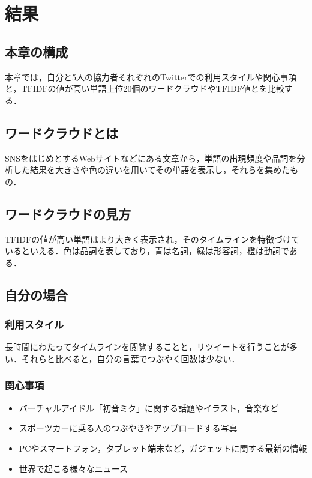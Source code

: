 \chapter{結果}

\section{本章の構成}
本章では，自分と5人の協力者それぞれのTwitterでの利用スタイルや関心事項と，TFIDFの値が高い単語上位20個のワードクラウドやTFIDF値とを比較する．

\section{ワードクラウドとは}
SNSをはじめとするWebサイトなどにある文章から，単語の出現頻度や品詞を分析した結果を大きさや色の違いを用いてその単語を表示し，それらを集めたもの．

\section{ワードクラウドの見方}
TFIDFの値が高い単語はより大きく表示され，そのタイムラインを特徴づけているといえる．色は品詞を表しており，青は名詞，緑は形容詞，橙は動詞である．

\section{自分の場合}

\subsection{利用スタイル}
長時間にわたってタイムラインを閲覧することと，リツイートを行うことが多い．それらと比べると，自分の言葉でつぶやく回数は少ない．

\subsection{関心事項}
\begin{itemize}
	\item バーチャルアイドル「初音ミク」に関する話題やイラスト，音楽など
	\item スポーツカーに乗る人のつぶやきやアップロードする写真
	\item PCやスマートフォン，タブレット端末など，ガジェットに関する最新の情報
	\item 世界で起こる様々なニュース
\end{itemize}

